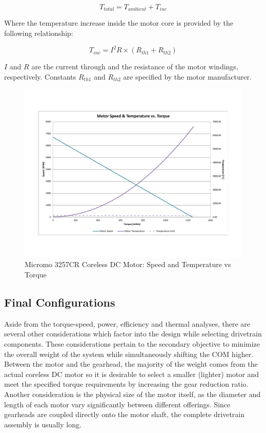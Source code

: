 \begin{equation}
	T_{total} = T_{ambient} + T_{inc}
\end{equation}

Where the temperature increase inside the motor core is provided by the following relationship: 

\begin{equation}
	T_{inc} = I^{2}R \times (R_{th1} + R_{th2})
\end{equation}

$I$ and $R$ are the current through and the resistance of the motor windings, respectively. Constants $R_{th1}$ and $R_{th2}$ are specified by the motor manufacturer. 


\begin{figure}[!ht]
	\begin{center}
    \includegraphics[trim = 20mm 30mm 20mm 30mm,clip,width=15cm]{fig/design/motor3.pdf}
	\end{center}
  \caption{Micromo 3257CR Coreless DC Motor: Speed and Temperature vs Torque}
\end{figure}

\subsection{Final Configurations} %
\label{sub:final_configurations}
Aside from the torque-speed, power, efficiency and thermal analyses, there are several other considerations which factor into the design  while selecting drivetrain components. These considerations pertain to the secondary objective to minimize the overall weight of the system while simultaneously shifting the COM higher. Between the motor and the gearhead, the majority of the weight comes from the actual coreless DC motor so it is desirable to select a smaller (lighter) motor and meet the specified torque requirements by increasing the gear reduction ratio. Another consideration is the physical size of the motor itself, as the diameter and length of each motor vary significantly between different offerings. Since gearheads are coupled directly onto the motor shaft, the complete drivetrain assembly is usually long. 

